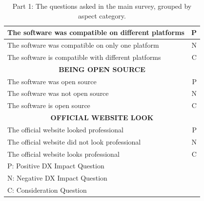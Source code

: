 \documentclass{article}
\begin{document}
\begin{table}[H]
\begin{tabularx}{\columnwidth}{X r}
The software was compatible on different platforms	&	P		\\ \hline
The software was compatible on only one platform	&	N		\\ \hline
The software is compatible with different platforms	&	C		\\ \hline \hline
\multicolumn{2}{c}{\textbf{	BEING OPEN SOURCE	}} \\ \hline
The software was open source	&	P		\\ \hline
The software was not open source	&	N		\\ \hline
The software is open source	&	C		\\ \hline \hline
\multicolumn{2}{c}{\textbf{	OFFICIAL WEBSITE LOOK	}} \\ \hline
The official website looked professional	&	P		\\ \hline
The official website did not look professional	&	N		\\ \hline
The official website looks professional	&	C		\\\hline \hline
\multicolumn{2}{l}{P: Positive DX Impact Question} \\
\multicolumn{2}{l}{N: Negative DX Impact Question} \\
\multicolumn{2}{l}{C: Consideration Question}

\end{tabularx}
\caption{Part 1: The questions asked in the main survey, grouped by aspect category.}
\label{tab:allQPart1}
\end{table}
\end{document}
